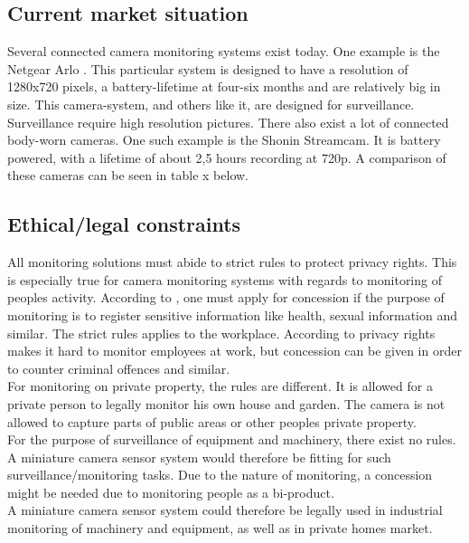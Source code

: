 \subsection{Current market situation}
Several connected camera monitoring systems exist today. One example is the Netgear Arlo \cite{Net_gear_arlo}. This particular system is designed to have a resolution of 1280x720 pixels, a battery-lifetime at four-six months and are relatively big in size. This camera-system, and others like it, are designed for surveillance. Surveillance require high resolution pictures.
There also exist a lot of connected body-worn cameras. One such example is the Shonin Streamcam\cite{Shonin}. It is battery powered, with a lifetime of about 2,5 hours recording at 720p. 
A comparison of these cameras can be seen in table x below.







\subsection{Ethical/legal constraints}
All monitoring solutions must abide to strict rules to protect privacy rights. This is especially true for camera monitoring systems with regards to monitoring of peoples activity. According to \cite{datatilsynet_konsesjon}, one must apply for concession if the purpose of monitoring is to register sensitive information like health, sexual information and similar. The strict rules applies to the workplace. According to \cite{datatilsynet_lov} privacy rights makes it hard to monitor employees at work, but concession can be given in order to counter criminal offences and similar. 
\\
For monitoring on private property, the rules are different. It is allowed for a private person to legally monitor his own house and garden. The camera is not allowed to capture parts of public areas or other peoples private property\cite{datatilsynet_lov}. 
\\
For the purpose of surveillance of equipment and machinery, there exist no rules. A miniature camera sensor system would therefore be fitting for such surveillance/monitoring tasks. Due to the nature of monitoring, a concession might be needed due to monitoring people as a bi-product. 
\\
A miniature camera sensor system could therefore be legally used in industrial monitoring of machinery and equipment, as well as in private homes market. 

